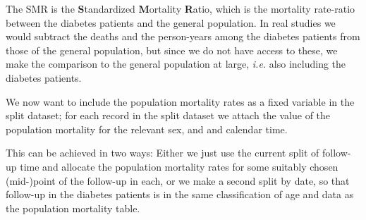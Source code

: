 The SMR is the \textbf{S}tandardized \textbf{M}ortality
\textbf{R}atio, which is the mortality rate-ratio between the diabetes
patients and the general population.  In real studies we would
subtract the deaths and the person-years among the diabetes patients
from those of the general population, but since we do not have access
to these, we make the comparison to the general population at large,
\textit{i.e.} also including the diabetes patients.

We now want to include the population mortality rates as a fixed
variable in the split dataset; for each record in the split dataset we
attach the value of the population mortality for the relevant sex, and
and calendar time.

This can be achieved in two ways: Either we just use the current split
of follow-up time and allocate the population mortality rates for some
suitably chosen (mid-)point of the follow-up in each, or we make a
second split by date, so that follow-up in the diabetes patients is in
the same classification of age and data as the population mortality
table.


